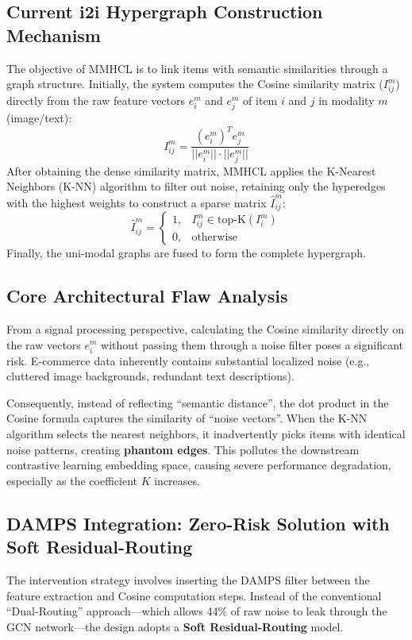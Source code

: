 \documentclass[12pt, a4paper]{article}
\begin{document}
\subsection{Current i2i Hypergraph Construction Mechanism}
The objective of MMHCL is to link items with semantic similarities through a graph structure. Initially, the system computes the Cosine similarity matrix ($I_{ij}^{m}$) directly from the raw feature vectors $e_i^m$ and $e_j^m$ of item $i$ and $j$ in modality $m$ (image/text):
\begin{equation}
I_{ij}^{m} = \frac{(e_i^m)^T e_j^m}{||e_i^m|| \cdot ||e_j^m||}
\end{equation}
After obtaining the dense similarity matrix, MMHCL applies the K-Nearest Neighbors (K-NN) algorithm to filter out noise, retaining only the hyperedges with the highest weights to construct a sparse matrix $\hat{I}_{ij}^{m}$:
\begin{equation}
\hat{I}_{ij}^{m} = \begin{cases} 1, & I_{ij}^{m} \in \text{top-K}(I_i^m) \\ 0, & \text{otherwise} \end{cases}
\end{equation}
Finally, the uni-modal graphs are fused to form the complete hypergraph.

\subsection{Core Architectural Flaw Analysis}
From a signal processing perspective, calculating the Cosine similarity directly on the raw vectors $e_i^m$ without passing them through a noise filter poses a significant risk. E-commerce data inherently contains substantial localized noise (e.g., cluttered image backgrounds, redundant text descriptions).

Consequently, instead of reflecting ``semantic distance'', the dot product in the Cosine formula captures the similarity of ``noise vectors''. When the K-NN algorithm selects the nearest neighbors, it inadvertently picks items with identical noise patterns, creating \textbf{phantom edges}. This pollutes the downstream contrastive learning embedding space, causing severe performance degradation, especially as the coefficient $K$ increases.

\subsection{DAMPS Integration: Zero-Risk Solution with Soft Residual-Routing}
The intervention strategy involves inserting the DAMPS filter between the feature extraction and Cosine computation steps. Instead of the conventional ``Dual-Routing'' approach—which allows 44\% of raw noise to leak through the GCN network—the design adopts a \textbf{Soft Residual-Routing} model.
\end{document}

